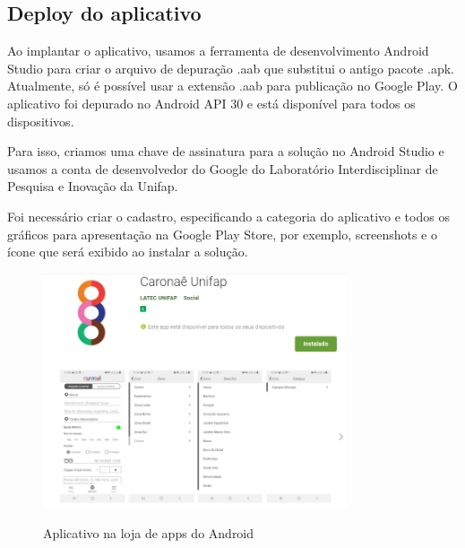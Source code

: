 \subsection{Deploy do aplicativo}
Ao implantar o aplicativo, usamos a ferramenta de desenvolvimento Android Studio para criar o arquivo de depuração .aab que substitui o antigo pacote .apk. Atualmente, só é possível usar a extensão .aab para publicação no Google Play. O aplicativo foi depurado no Android API 30 e está disponível para todos os dispositivos.

Para isso, criamos uma chave de assinatura para a solução no Android Studio e usamos a conta de desenvolvedor do Google do Laboratório Interdisciplinar de Pesquisa e Inovação da Unifap.

Foi necessário criar o cadastro, especificando a categoria do aplicativo e todos os gráficos para apresentação na Google Play Store, por exemplo, screenshots e o ícone que será exibido ao instalar a solução.

\begin{figure}[H]
	\centering
	\caption{Aplicativo na loja de apps do Android}
	\includegraphics[width=0.8\textwidth]{./04-figuras/googleplay/googleplay.png}
	\label{fig:googleplay}
\end{figure}

